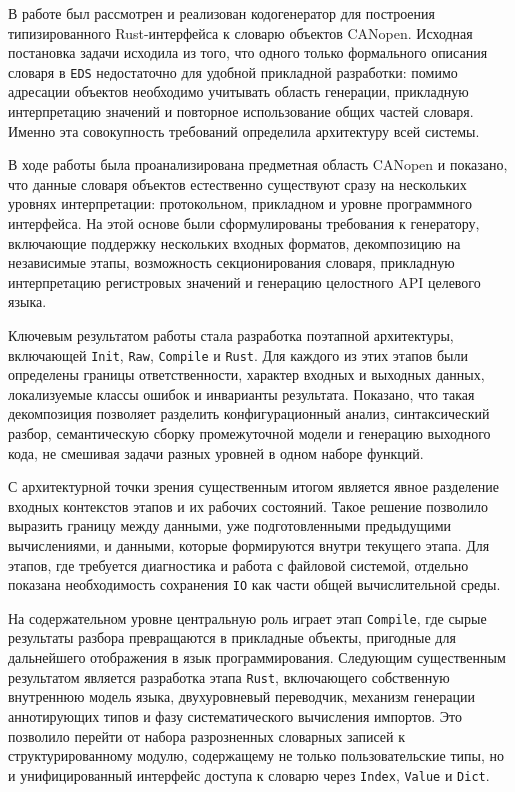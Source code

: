 \documentclass[a4paper,12pt]{article}
\begin{document}

В работе был рассмотрен и реализован кодогенератор для построения типизированного
Rust-интерфейса к словарю объектов CANopen. Исходная постановка задачи исходила из
того, что одного только формального описания словаря в \texttt{EDS} недостаточно для
удобной прикладной разработки: помимо адресации объектов необходимо учитывать область
генерации, прикладную интерпретацию значений и повторное использование общих частей
словаря. Именно эта совокупность требований определила архитектуру всей системы.

В ходе работы была проанализирована предметная область CANopen и показано, что данные
словаря объектов естественно существуют сразу на нескольких уровнях интерпретации:
протокольном, прикладном и уровне программного интерфейса. На этой основе были
сформулированы требования к генератору, включающие поддержку нескольких входных
форматов, декомпозицию на независимые этапы, возможность секционирования словаря,
прикладную интерпретацию регистровых значений и генерацию целостного API целевого
языка.

Ключевым результатом работы стала разработка поэтапной архитектуры, включающей
\texttt{Init}, \texttt{Raw}, \texttt{Compile} и \texttt{Rust}. Для каждого из этих
этапов были определены границы ответственности, характер входных и выходных данных,
локализуемые классы ошибок и инварианты результата. Показано, что такая декомпозиция
позволяет разделить конфигурационный анализ, синтаксический разбор, семантическую
сборку промежуточной модели и генерацию выходного кода, не смешивая задачи разных
уровней в одном наборе функций.

С архитектурной точки зрения существенным итогом является явное разделение входных
контекстов этапов и их рабочих состояний. Такое решение позволило выразить границу
между данными, уже подготовленными предыдущими вычислениями, и данными, которые
формируются внутри текущего этапа. Для этапов, где требуется диагностика и работа с
файловой системой, отдельно показана необходимость сохранения \texttt{IO} как части
общей вычислительной среды.

На содержательном уровне центральную роль играет этап \texttt{Compile}, где сырые
результаты разбора превращаются в прикладные объекты, пригодные для дальнейшего
отображения в язык программирования. Следующим существенным результатом является
разработка этапа \texttt{Rust}, включающего собственную внутреннюю модель языка,
двухуровневый переводчик, механизм генерации аннотирующих типов и фазу систематического
вычисления импортов. Это позволило перейти от набора разрозненных словарных записей к
структурированному модулю, содержащему не только пользовательские типы, но и
унифицированный интерфейс доступа к словарю через \texttt{Index}, \texttt{Value} и
\texttt{Dict}.
\end{document}
